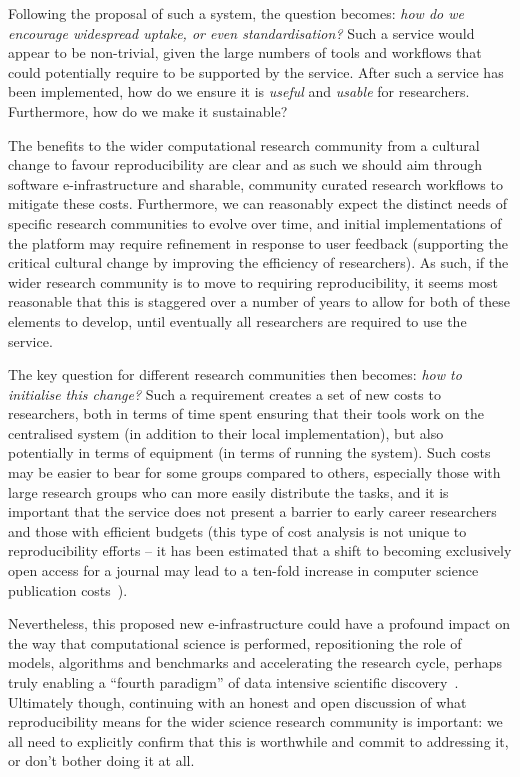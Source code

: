 \documentclass[a4paper,11pt]{article}
\begin{document}
Following the proposal of such a system, the question becomes:
{\emph{how do we encourage widespread uptake, or even
standardisation?}}  Such a service would appear to be non-trivial,
given the large numbers of tools and workflows that could potentially
require to be supported by the service. After such a service has been
implemented, how do we ensure it is \emph{useful} and \emph{usable}
for researchers. Furthermore, how do we make it sustainable?

The benefits to the wider computational research community from a
cultural change to favour reproducibility are clear and as such we
should aim through software e-infrastructure and sharable,
community curated research workflows to mitigate these
costs. Furthermore, we can reasonably expect the distinct needs of
specific research communities to evolve over time, and initial
implementations of the platform may require refinement in response to
user feedback (supporting the critical cultural change by improving
the efficiency of researchers). As such, if the wider research
community is to move to requiring reproducibility, it seems most
reasonable that this is staggered over a number of years to allow for
both of these elements to develop, until eventually all researchers
are required to use the service.

The key question for different research communities then becomes:
{\emph{how to initialise this change?}} Such a requirement creates a
set of new costs to researchers, both in terms of time spent ensuring
that their tools work on the centralised system (in addition to their
local implementation), but also potentially in terms of equipment (in
terms of running the system). Such costs may be easier to bear for
some groups compared to others, especially those with large research
groups who can more easily distribute the tasks, and it is important
that the service does not present a barrier to early career
researchers and those with efficient budgets (this type of cost
analysis is not unique to reproducibility efforts -- it has been
estimated that a shift to becoming exclusively open access for a
journal may lead to a ten-fold increase in computer science
publication costs~\cite{vardi-cacm-2014}).

Nevertheless, this proposed new e-infrastructure could have a profound
impact on the way that computational science is performed,
repositioning the role of models, algorithms and benchmarks and
accelerating the research cycle, perhaps truly enabling a ``fourth
paradigm'' of data intensive scientific discovery~\cite{hey:2009}.
Ultimately though, continuing with an honest and open discussion of
what reproducibility means for the wider science research community is
important: we all need to explicitly confirm that this is worthwhile
and commit to addressing it, or don't bother doing it at all.
\end{document}

